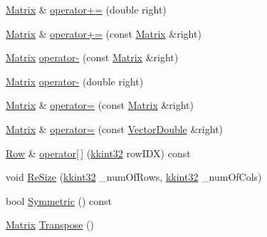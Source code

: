 \begin{DoxyCompactItemize}
$$\item 
\hyperlink{class_k_k_b_1_1_matrix}{Matrix} \& \hyperlink{class_k_k_b_1_1_matrix_a86ef5684a657a07509a1f99ba0acf144}{operator+=} (double right)
\item 
\hyperlink{class_k_k_b_1_1_matrix}{Matrix} \& \hyperlink{class_k_k_b_1_1_matrix_a4612e586fd64b716842cd964b2f3cdbc}{operator+=} (const \hyperlink{class_k_k_b_1_1_matrix}{Matrix} \&right)
\item 
\hyperlink{class_k_k_b_1_1_matrix}{Matrix} \hyperlink{class_k_k_b_1_1_matrix_a515dad949068dde646ca73d9d69d9672}{operator-\/} (const \hyperlink{class_k_k_b_1_1_matrix}{Matrix} \&right)
\item 
\hyperlink{class_k_k_b_1_1_matrix}{Matrix} \hyperlink{class_k_k_b_1_1_matrix_abdae6b017f749792e303749cbe74f57a}{operator-\/} (double right)
\item 
\hyperlink{class_k_k_b_1_1_matrix}{Matrix} \& \hyperlink{class_k_k_b_1_1_matrix_a127463de2d624abeaf5924c0f2fe798d}{operator=} (const \hyperlink{class_k_k_b_1_1_matrix}{Matrix} \&right)
\item 
\hyperlink{class_k_k_b_1_1_matrix}{Matrix} \& \hyperlink{class_k_k_b_1_1_matrix_acd15e0e4eb7b499030cd8af1dfd3f409}{operator=} (const \hyperlink{namespace_k_k_b_a5906c207479607e5f450434095914a41}{Vector\+Double} \&right)
\item 
\hyperlink{class_k_k_b_1_1_row}{Row} \& \hyperlink{class_k_k_b_1_1_matrix_a5bc7829435bc1063b82a91c1b82d5be5}{operator\mbox{[}$\,$\mbox{]}} (\hyperlink{namespace_k_k_b_a8fa4952cc84fda1de4bec1fbdd8d5b1b}{kkint32} row\+I\+DX) const 
\item 
void \hyperlink{class_k_k_b_1_1_matrix_ac2d0c31477e85bad55e6a1cd5be1b302}{Re\+Size} (\hyperlink{namespace_k_k_b_a8fa4952cc84fda1de4bec1fbdd8d5b1b}{kkint32} \+\_\+num\+Of\+Rows, \hyperlink{namespace_k_k_b_a8fa4952cc84fda1de4bec1fbdd8d5b1b}{kkint32} \+\_\+num\+Of\+Cols)
\item 
bool \hyperlink{class_k_k_b_1_1_matrix_a68ce1e9491bb1c1a69ce16bbd12bb6db}{Symmetric} () const 
\item 
\hyperlink{class_k_k_b_1_1_matrix}{Matrix} \hyperlink{class_k_k_b_1_1_matrix_af9b74b284027c584dc75ae674e65f58d}{Transpose} ()
\end{DoxyCompactItemize}
